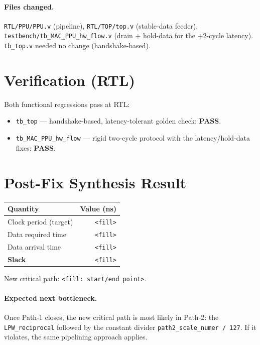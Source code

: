 \documentclass[11pt]{article}
\begin{document}
\paragraph{Files changed.}
\texttt{RTL/PPU/PPU.v} (pipeline), \texttt{RTL/TOP/top.v} (stable-data feeder),
\texttt{testbench/tb\_MAC\_PPU\_hw\_flow.v} (drain + hold-data for the $+2$-cycle
latency). \texttt{tb\_top.v} needed no change (handshake-based).

\section{Verification (RTL)}

Both functional regressions pass at RTL:
\begin{itemize}
  \item \texttt{tb\_top} --- handshake-based, latency-tolerant golden check: \textbf{PASS}.
  \item \texttt{tb\_MAC\_PPU\_hw\_flow} --- rigid two-cycle protocol with the
        latency/hold-data fixes: \textbf{PASS}.
\end{itemize}

\section{Post-Fix Synthesis Result}
\label{sec:after}


\begin{center}
\begin{tabular}{lr}
\toprule
Quantity & Value (ns) \\
\midrule
Clock period (target) & \texttt{<fill>} \\
Data required time    & \texttt{<fill>} \\
Data arrival time     & \texttt{<fill>} \\
\midrule
\textbf{Slack}        & \texttt{<fill>} \\
\bottomrule
\end{tabular}
\end{center}

\noindent New critical path: \texttt{<fill: start/end point>}.

\paragraph{Expected next bottleneck.} Once Path-1 closes, the new critical path
is most likely in Path-2: the \texttt{LPW\_reciprocal} followed by the constant
divider \texttt{path2\_scale\_numer / 127}. If it violates, the same pipelining
approach applies.
\end{document}
